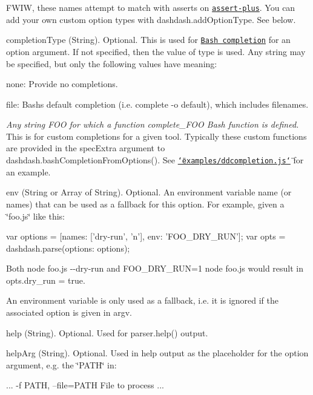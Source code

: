 \begin{DoxyItemize}
F\+W\+IW, these names attempt to match with asserts on \href{https://github.com/mcavage/node-assert-plus}{\tt assert-\/plus}. You can add your own custom option types with {\ttfamily dashdash.\+add\+Option\+Type}. See below.
\item {\ttfamily completion\+Type} (String). Optional. This is used for \href{#bash-completion}{\tt Bash completion} for an option argument. If not specified, then the value of {\ttfamily type} is used. Any string may be specified, but only the following values have meaning\+:
\begin{DoxyItemize}
\item {\ttfamily none}\+: Provide no completions.
\item {\ttfamily file}\+: Bash\textquotesingle{}s default completion (i.\+e. {\ttfamily complete -\/o default}), which includes filenames.
\item {\itshape Any string F\+OO for which a {\ttfamily function complete\+\_\+\+F\+OO} Bash function is defined.} This is for custom completions for a given tool. Typically these custom functions are provided in the {\ttfamily spec\+Extra} argument to {\ttfamily dashdash.\+bash\+Completion\+From\+Options()}. See \href{examples/ddcompletion.js}{\tt \char`\"{}examples/ddcompletion.\+js\char`\"{}} for an example.
\end{DoxyItemize}
\item {\ttfamily env} (String or Array of String). Optional. An environment variable name (or names) that can be used as a fallback for this option. For example, given a \char`\"{}foo.\+js\char`\"{} like this\+: \begin{DoxyVerb}  var options = [{names: ['dry-run', 'n'], env: 'FOO_DRY_RUN'}];
  var opts = dashdash.parse({options: options});
\end{DoxyVerb}


Both {\ttfamily node foo.\+js -\/-\/dry-\/run} and {\ttfamily F\+O\+O\+\_\+\+D\+R\+Y\+\_\+\+R\+UN=1 node foo.\+js} would result in {\ttfamily opts.\+dry\+\_\+run = true}.

An environment variable is only used as a fallback, i.\+e. it is ignored if the associated option is given in {\ttfamily argv}.
\item {\ttfamily help} (String). Optional. Used for {\ttfamily parser.\+help()} output.
\item {\ttfamily help\+Arg} (String). Optional. Used in help output as the placeholder for the option argument, e.\+g. the \char`\"{}\+P\+A\+T\+H\char`\"{} in\+: \begin{DoxyVerb}  ...
  -f PATH, --file=PATH    File to process
  ...
\end{DoxyVerb}


\end{DoxyItemize}
